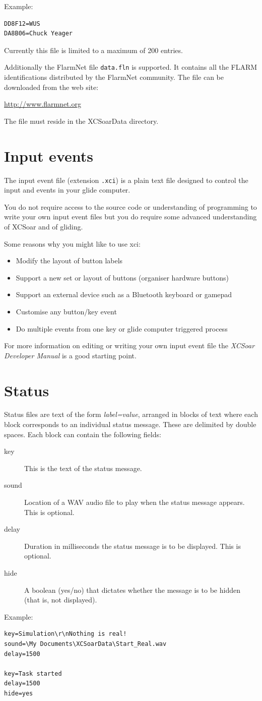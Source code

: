 Example:
\begin{verbatim}
DD8F12=WUS
DA8B06=Chuck Yeager
\end{verbatim}

Currently this file is limited to a maximum of 200 entries.

Additionally the FlarmNet file \verb|data.fln| is supported. It contains all 
the FLARM identifications distributed by the FlarmNet community. The file can 
be downloaded from the web site:

\url{http://www.flarmnet.org}

The file must reside in the XCSoarData directory.


\section{Input events}

The input event file (extension \verb|.xci|) is a plain text file
designed to control the input and events in your glide computer.

You do not require access to the source code or understanding of
programming to write your own input event files but you do require
some advanced understanding of XCSoar and of gliding.

Some reasons why you might like to use xci:
\begin{itemize}
\item Modify the layout of button labels
\item Support a new set or layout of buttons (organiser hardware buttons)
\item Support an external device such as a Bluetooth keyboard or gamepad
\item Customise any button/key event
\item Do multiple events from one key or glide computer triggered process
\end{itemize}
For more information on editing or writing your own input event
file the {\em XCSoar Developer Manual} is a good starting point.


\section{Status}\label{sec:status-file}

Status files are text of the form {\em label=value}, arranged in
blocks of text where each block corresponds to an individual status
message.  These are delimited by double spaces.  Each block can
contain the following fields:
\begin{description}
\item[key]  This is the text of the status message.
\item[sound] Location of a WAV audio file to play when the status
  message appears.  This is optional.
\item[delay] Duration in milliseconds the status message is
  to be displayed.  This is optional.
\item[hide] A boolean (yes/no) that dictates whether the message
 is to be hidden (that is, not displayed). 
\end{description} 

Example:
\begin{verbatim}
key=Simulation\r\nNothing is real!
sound=\My Documents\XCSoarData\Start_Real.wav
delay=1500

key=Task started
delay=1500
hide=yes
\end{verbatim}
